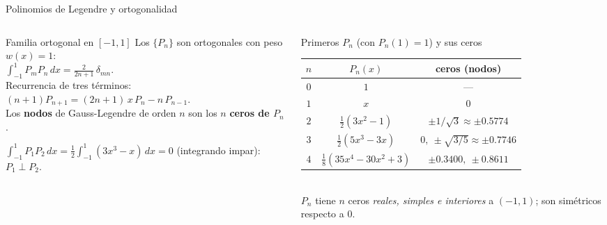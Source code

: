 \documentclass[aspectratio=169,10pt]{beamer}
\begin{document}
\begin{frame}{Polinomios de Legendre y ortogonalidad}
\begin{columns}[T]
\begin{column}{0.47\textwidth}
\begin{cardidea}{Familia ortogonal en $[-1,1]$}{\faSuperscript}
{\footnotesize Los $\{P_n\}$ son ortogonales con peso $w(x)=1$:\\[0.4mm]
$\displaystyle\int_{-1}^1 P_m P_n\,dx=\frac{2}{2n+1}\,\delta_{mn}.$\\[1.0mm]
Recurrencia de tres términos:\\[0.2mm]
$(n{+}1)P_{n+1}=(2n{+}1)\,x\,P_n-n\,P_{n-1}.$\\[0.8mm]
Los \textbf{nodos} de Gauss-Legendre de orden $n$ son los $n$ \textbf{ceros de $P_n$}.}
\end{cardidea}
\vspace{1mm}
\begin{cardnota}[\faCheckCircle]
{\footnotesize $\displaystyle\int_{-1}^1 P_1P_2\,dx=\tfrac12\!\int_{-1}^1(3x^3{-}x)\,dx=0$ (integrando impar): $P_1\perp P_2$.}
\end{cardnota}
\end{column}
\begin{column}{0.51\textwidth}
\begin{cardgear}{Primeros $P_n$ (con $P_n(1)=1$) y sus ceros}{\faTable}
\centering
{\footnotesize\renewcommand{\arraystretch}{1.38}\setlength{\tabcolsep}{4pt}
\begin{tabular}{c|c|c}
$n$ & $P_n(x)$ & ceros (nodos)\\\hline
$0$ & $1$ & —\\
$1$ & $x$ & $0$\\
$2$ & $\tfrac12(3x^2-1)$ & $\pm1/\sqrt3\approx\pm0.5774$\\
$3$ & $\tfrac12(5x^3-3x)$ & $0,\ \pm\sqrt{3/5}\approx\pm0.7746$\\
$4$ & $\tfrac18(35x^4{-}30x^2{+}3)$ & $\pm0.3400,\ \pm0.8611$\\
\end{tabular}}\\[1.2mm]
{\footnotesize $P_n$ tiene $n$ ceros \emph{reales, simples e interiores} a $(-1,1)$; son simétricos respecto a $0$.}
\end{cardgear}
\end{column}
\end{columns}
\end{frame}
\end{document}
